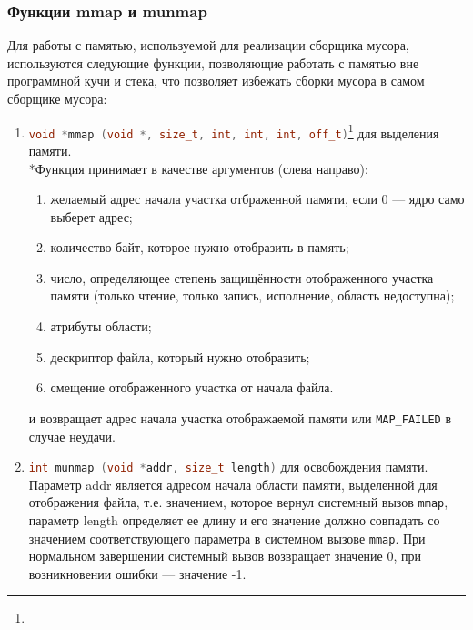 \subsubsection{Функции mmap и munmap}
Для работы с памятью, используемой для реализации сборщика мусора, используются следующие функции, позволяющие
работать с памятью вне программной кучи и стека, что позволяет избежать сборки мусора в самом сборщике мусора:
\begin{enumerate}
\item \lstinline[language= cpp]{void *mmap (void *, size_t, int, int, int, off_t)}\footnote{}
	для выделения памяти.\\*Функция принимает в качестве аргументов (слева направо):
	\begin{enumerate}
	\item желаемый адрес начала участка отбраженной памяти, если 0 --- ядро само выберет адрес;
	\item количество байт, которое нужно отобразить в память;
	\item число, определяющее степень защищённости отображенного участка памяти (только чтение, только запись, исполнение, область
		недоступна);
	\item атрибуты области;
	\item дескриптор файла, который нужно отобразить;
	\item смещение отображенного участка от начала файла.
	\end{enumerate}
	и возвращает адрес начала участка отображаемой памяти или \lstinline[language= cpp]{MAP_FAILED} в случае неудачи.
\item \lstinline[language= cpp]{int munmap (void *addr, size_t length)} для освобождения памяти.
	Параметр addr является адресом начала области памяти, выделенной для отображения файла, т.е. значением, которое вернул системный вызов \lstinline[language= cpp]{mmap}, параметр length определяет ее длину и его значение должно совпадать со значением соответствующего параметра в системном вызове \lstinline[language= cpp]{mmap}. При нормальном завершении системный вызов возвращает значение 0, при возникновении ошибки --- значение -1.	
\end{enumerate}

